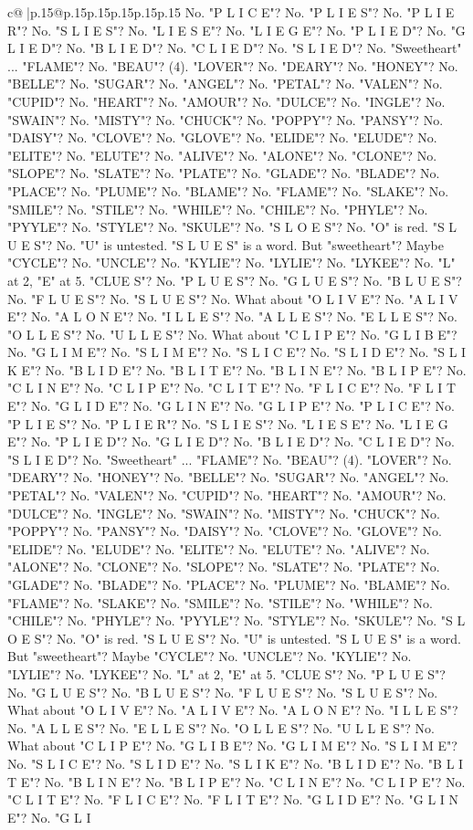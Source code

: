 \documentclass{article}
\begin{document}
{\begin{supertabular}{c@{$\;$}|p{.15\linewidth}@{}p{.15\linewidth}p{.15\linewidth}p{.15\linewidth}p{.15\linewidth}p{.15\linewidth}}
{{{No. "P L I C E"? No. "P L I E S"? No. "P L I E R"? No. "S L I E S"? No. "L I E S E"? No. "L I E G E"? No. "P L I E D"? No. "G L I E D"? No. "B L I E D"? No. "C L I E D"? No. "S L I E D"? No. "Sweetheart" ... "FLAME"? No. "BEAU"? (4). "LOVER"? No. "DEARY"? No. "HONEY"? No. "BELLE"? No. "SUGAR"? No. "ANGEL"? No. "PETAL"? No. "VALEN"? No. "CUPID"? No. "HEART"? No. "AMOUR"? No. "DULCE"? No. "INGLE"? No. "SWAIN"? No. "MISTY"? No. "CHUCK"? No. "POPPY"? No. "PANSY"? No. "DAISY"? No. "CLOVE"? No. "GLOVE"? No. "ELIDE"? No. "ELUDE"? No. "ELITE"? No. "ELUTE"? No. "ALIVE"? No. "ALONE"? No. "CLONE"? No. "SLOPE"? No. "SLATE"? No. "PLATE"? No. "GLADE"? No. "BLADE"? No. "PLACE"? No. "PLUME"? No. "BLAME"? No. "FLAME"? No. "SLAKE"? No. "SMILE"? No. "STILE"? No. "WHILE"? No. "CHILE"? No. "PHYLE"? No. "PYYLE"? No. "STYLE"? No. "SKULE"? No. "S L O E S"? No. "O" is red. "S L U E S"? No. "U" is untested. "S L U E S" is a word. But "sweetheart"? Maybe "CYCLE"? No. "UNCLE"? No. "KYLIE"? No. "LYLIE"? No. "LYKEE"? No. "L" at 2, "E" at 5. "CLUE S"? No. "P L U E S"? No. "G L U E S"? No. "B L U E S"? No. "F L U E S"? No. "S L U E S"? No. What about "O L I V E"? No. "A L I V E"? No. "A L O N E"? No. "I L L E S"? No. "A L L E S"? No. "E L L E S"? No. "O L L E S"? No. "U L L E S"? No. What about "C L I P E"? No. "G L I B E"? No. "G L I M E"? No. "S L I M E"? No. "S L I C E"? No. "S L I D E"? No. "S L I K E"? No. "B L I D E"? No. "B L I T E"? No. "B L I N E"? No. "B L I P E"? No. "C L I N E"? No. "C L I P E"? No. "C L I T E"? No. "F L I C E"? No. "F L I T E"? No. "G L I D E"? No. "G L I N E"? No. "G L I P E"? No. "P L I C E"? No. "P L I E S"? No. "P L I E R"? No. "S L I E S"? No. "L I E S E"? No. "L I E G E"? No. "P L I E D"? No. "G L I E D"? No. "B L I E D"? No. "C L I E D"? No. "S L I E D"? No. "Sweetheart" ... "FLAME"? No. "BEAU"? (4). "LOVER"? No. "DEARY"? No. "HONEY"? No. "BELLE"? No. "SUGAR"? No. "ANGEL"? No. "PETAL"? No. "VALEN"? No. "CUPID"? No. "HEART"? No. "AMOUR"? No. "DULCE"? No. "INGLE"? No. "SWAIN"? No. "MISTY"? No. "CHUCK"? No. "POPPY"? No. "PANSY"? No. "DAISY"? No. "CLOVE"? No. "GLOVE"? No. "ELIDE"? No. "ELUDE"? No. "ELITE"? No. "ELUTE"? No. "ALIVE"? No. "ALONE"? No. "CLONE"? No. "SLOPE"? No. "SLATE"? No. "PLATE"? No. "GLADE"? No. "BLADE"? No. "PLACE"? No. "PLUME"? No. "BLAME"? No. "FLAME"? No. "SLAKE"? No. "SMILE"? No. "STILE"? No. "WHILE"? No. "CHILE"? No. "PHYLE"? No. "PYYLE"? No. "STYLE"? No. "SKULE"? No. "S L O E S"? No. "O" is red. "S L U E S"? No. "U" is untested. "S L U E S" is a word. But "sweetheart"? Maybe "CYCLE"? No. "UNCLE"? No. "KYLIE"? No. "LYLIE"? No. "LYKEE"? No. "L" at 2, "E" at 5. "CLUE S"? No. "P L U E S"? No. "G L U E S"? No. "B L U E S"? No. "F L U E S"? No. "S L U E S"? No. What about "O L I V E"? No. "A L I V E"? No. "A L O N E"? No. "I L L E S"? No. "A L L E S"? No. "E L L E S"? No. "O L L E S"? No. "U L L E S"? No. What about "C L I P E"? No. "G L I B E"? No. "G L I M E"? No. "S L I M E"? No. "S L I C E"? No. "S L I D E"? No. "S L I K E"? No. "B L I D E"? No. "B L I T E"? No. "B L I N E"? No. "B L I P E"? No. "C L I N E"? No. "C L I P E"? No. "C L I T E"? No. "F L I C E"? No. "F L I T E"? No. "G L I D E"? No. "G L I N E"? No. "G L I }}}
\end{supertabular}}
\end{document}
